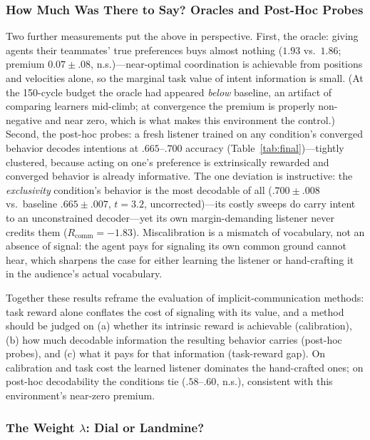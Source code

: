 \documentclass{article}
\newcommand{\Rcomm}{R_{\text{comm}}}
\begin{document}
\subsubsection{How Much Was There to Say? Oracles and Post-Hoc Probes}
\label{ssec:results_oracle}

Two further measurements put the above in perspective. First, the oracle: giving agents their teammates' true preferences buys almost nothing ($1.93$ vs.\ $1.86$; premium $0.07\pm.08$, n.s.)---near-optimal coordination is achievable from positions and velocities alone, so the marginal task value of intent information is small. (At the 150-cycle budget the oracle had appeared \emph{below} baseline, an artifact of comparing learners mid-climb; at convergence the premium is properly non-negative and near zero, which is what makes this environment the control.) Second, the post-hoc probes: a fresh listener trained on any condition's converged behavior decodes intentions at $.665$--$.700$ accuracy (Table~\ref{tab:final})---tightly clustered, because acting on one's preference is extrinsically rewarded and converged behavior is already informative. The one deviation is instructive: the \emph{exclusivity} condition's behavior is the most decodable of all ($.700\pm.008$ vs.\ baseline $.665\pm.007$, $t=3.2$, uncorrected)---its costly sweeps do carry intent to an unconstrained decoder---yet its own margin-demanding listener never credits them ($\Rcomm=-1.83$). Miscalibration is a mismatch of vocabulary, not an absence of signal: the agent pays for signaling its own common ground cannot hear, which sharpens the case for either learning the listener or hand-crafting it in the audience's actual vocabulary.

Together these results reframe the evaluation of implicit-communication methods: task reward alone conflates the cost of signaling with its value, and a method should be judged on (a) whether its intrinsic reward is achievable (calibration), (b) how much decodable information the resulting behavior carries (post-hoc probes), and (c) what it pays for that information (task-reward gap). On calibration and task cost the learned listener dominates the hand-crafted ones; on post-hoc decodability the conditions tie ($.58$--$.60$, n.s.), consistent with this environment's near-zero premium.

\subsubsection{The Weight $\lambda$: Dial or Landmine?}
\label{ssec:results_lambda}
\end{document}
